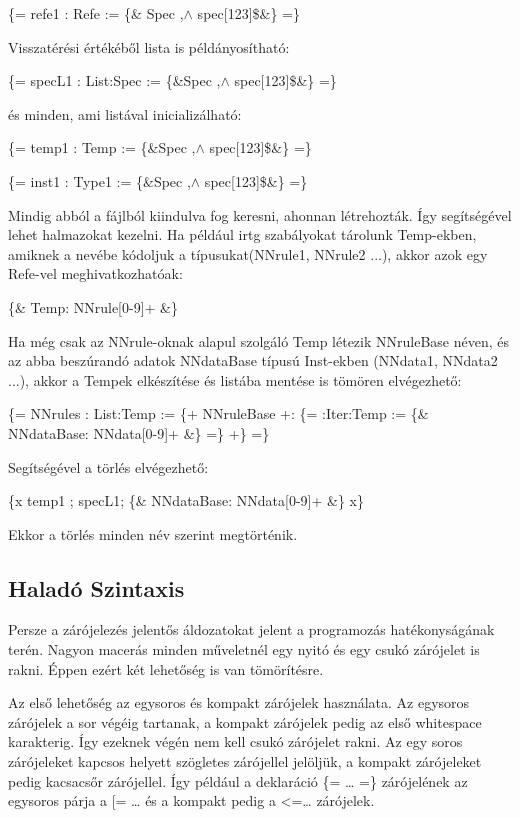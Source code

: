 {

\{= refe1 : Refe := \{\& Spec ,$\land$ spec[123]\$\&\} =\}

Visszatérési értékéből lista is példányosítható:

\{= specL1 : List:Spec := \{\&Spec ,$\land$ spec[123]\$\&\} =\}

és minden, ami listával inicializálható:

\{= temp1 : Temp := \{\&Spec ,$\land$ spec[123]\$\&\} =\}

\{= inst1 : Type1 := \{\&Spec ,$\land$ spec[123]\$\&\} =\}

Mindig abból a fájlból kiindulva fog keresni, ahonnan létrehozták.
Így segítségével lehet halmazokat kezelni.
Ha például irtg szabályokat tárolunk Temp-ekben, amiknek a nevébe kódoljuk a típusukat(NNrule1, NNrule2 ...),
akkor azok egy Refe-vel meghivatkozhatóak:

\{\& Temp: NNrule[0-9]+ \&\}

Ha még csak az NNrule-oknak alapul szolgáló Temp létezik NNruleBase néven, 
és az abba beszúrandó adatok  NNdataBase típusú Inst-ekben (NNdata1, NNdata2 ...),
akkor a Tempek elkészítése és listába mentése is tömören elvégezhető:

\{= NNrules : List:Temp := \{+ NNruleBase +: \{= :Iter:Temp := \{\& NNdataBase: NNdata[0-9]+ \&\} =\} +\} =\}

Segítségével a törlés elvégezhető:

\{x temp1 ; specL1; \{\& NNdataBase: NNdata[0-9]+ \&\} x\}

Ekkor a törlés minden név szerint megtörténik.


\subsection{Haladó Szintaxis}
Persze a zárójelezés jelentős áldozatokat jelent a programozás hatékonyságának terén. 
Nagyon macerás minden műveletnél egy nyitó és egy csukó zárójelet is rakni. 
Éppen ezért két lehetőség is van tömörítésre.

Az első lehetőség az egysoros és kompakt zárójelek használata. 
Az egysoros zárójelek a sor végéig tartanak, a kompakt zárójelek pedig az első whitespace karakterig. 
Így ezeknek végén nem kell csukó zárójelet rakni. 
Az egy soros zárójeleket kapcsos helyett szögletes zárójellel jelöljük, a kompakt zárójeleket pedig kacsacsőr zárójellel. 
Így például a deklaráció \{= … =\} zárójelének az egysoros párja a [= … és a kompakt pedig a <=… zárójelek.

}

